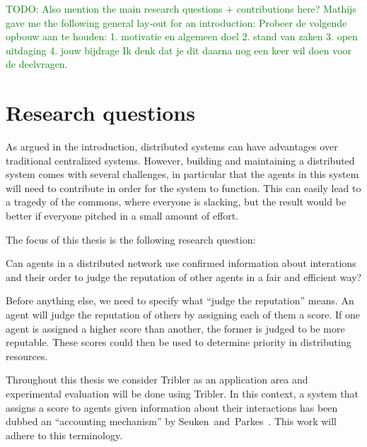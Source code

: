\documentclass[a4paper,11pt]{book}
\newcommand\suggestion[1]{\textcolor{green}{TODO: #1}}
\theoremstyle{definition}
\begin{document}
\suggestion{Also mention the main research questions + contributions here? Mathijs gave me the following general lay-out
for an introduction: Probeer de volgende opbouw aan te houden:  1. motivatie en algemeen doel 2. stand van zaken 3. open
uitdaging 4. jouw bijdrage Ik denk dat je dit daarna nog een keer wil doen voor de deelvragen.}


\chapter{Research questions}
\label{chap:research_questions}

As argued in the introduction, distributed systems can have advantages over traditional centralized
systems. However, building and maintaining a distributed system comes with several challenges, in particular that
the agents in this system will need to contribute in order for the system to
function. This can easily lead to a tragedy of the commons, where everyone is slacking,
but the result would be better if everyone pitched in a small amount of effort.

The focus of this thesis is the following research question:
\begin{center}
    Can agents in a distributed network use confirmed information about
    interations and their order to judge the reputation of other agents
    in a fair and efficient way?
\end{center}


Before anything else, we need to specify what ``judge the reputation'' means.
An agent will judge the reputation of others by assigning each of them a score.
If one agent is assigned a higher score than another, the former is judged to be more
reputable.  These scores could then be used to determine priority in distributing resources.

Throughout this thesis we consider Tribler as an application area and experimental
evaluation will be done using Tribler. 
In this context, a system that assigns a score
to agents given information about their interactions has been dubbed an 
``accounting mechanism'' by Seuken~and~Parkes~\cite{seuken2010accounting}. This
work will adhere to this terminology.
\end{document}
